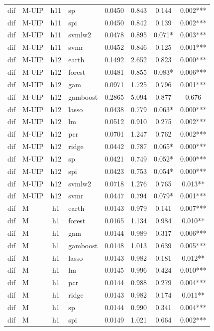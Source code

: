 \begin{ThreePartTable}
\begin{longtable}[t]{llclcccc}
dif & M-UIP & h11 & sp & 0.0450 & 0.843 & 0.144 & 0.002***\\
dif & M-UIP & h11 & spi & 0.0450 & 0.842 & 0.139 & 0.002***\\
dif & M-UIP & h11 & svmlw2 & 0.0478 & 0.895 & 0.071* & 0.003***\\
dif & M-UIP & h11 & svmr & 0.0452 & 0.846 & 0.125 & 0.001***\\
\addlinespace
dif & M-UIP & h12 & earth & 0.1492 & 2.652 & 0.823 & 0.000***\\
dif & M-UIP & h12 & forest & 0.0481 & 0.855 & 0.083* & 0.006***\\
dif & M-UIP & h12 & gam & 0.0971 & 1.725 & 0.796 & 0.001***\\
dif & M-UIP & h12 & gamboost & 0.2865 & 5.094 & 0.877 & 0.676\\
dif & M-UIP & h12 & lasso & 0.0438 & 0.779 & 0.063* & 0.000***\\
dif & M-UIP & h12 & lm & 0.0512 & 0.910 & 0.275 & 0.002***\\
dif & M-UIP & h12 & pcr & 0.0701 & 1.247 & 0.762 & 0.002***\\
dif & M-UIP & h12 & ridge & 0.0442 & 0.787 & 0.065* & 0.000***\\
dif & M-UIP & h12 & sp & 0.0421 & 0.749 & 0.052* & 0.000***\\
dif & M-UIP & h12 & spi & 0.0423 & 0.753 & 0.054* & 0.000***\\
dif & M-UIP & h12 & svmlw2 & 0.0718 & 1.276 & 0.765 & 0.013**\\
dif & M-UIP & h12 & svmr & 0.0447 & 0.794 & 0.079* & 0.001***\\
\addlinespace
dif & M & h1 & earth & 0.0143 & 0.979 & 0.141 & 0.007***\\
dif & M & h1 & forest & 0.0165 & 1.134 & 0.984 & 0.010**\\
dif & M & h1 & gam & 0.0144 & 0.989 & 0.317 & 0.006***\\
dif & M & h1 & gamboost & 0.0148 & 1.013 & 0.639 & 0.005***\\
dif & M & h1 & lasso & 0.0143 & 0.982 & 0.181 & 0.012**\\
dif & M & h1 & lm & 0.0145 & 0.996 & 0.424 & 0.010***\\
dif & M & h1 & pcr & 0.0144 & 0.988 & 0.279 & 0.004***\\
dif & M & h1 & ridge & 0.0143 & 0.982 & 0.174 & 0.011**\\
dif & M & h1 & sp & 0.0144 & 0.990 & 0.341 & 0.004***\\
dif & M & h1 & spi & 0.0149 & 1.021 & 0.664 & 0.002***\\

\end{longtable}
\end{ThreePartTable}
